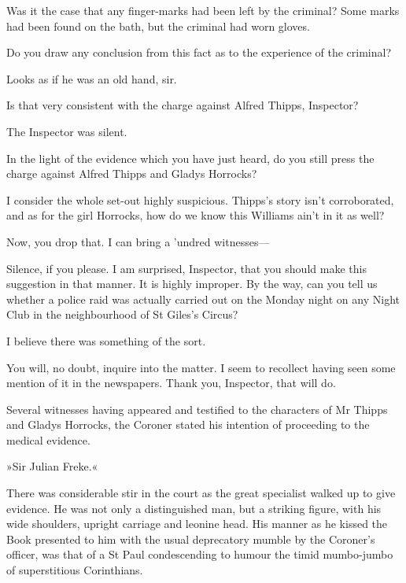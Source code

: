 \begin{dialogue}
 Was it the case that any finger-marks had been left by the criminal?
Some marks had been found on the bath, but the criminal had worn gloves.

 Do you draw any conclusion from this fact as to the experience of the criminal?

 Looks as if he was an old hand, sir.

 Is that very consistent with the charge against Alfred Thipps, Inspector?

The Inspector was silent.

 In the light of the evidence which you have just heard, do you still press the charge against Alfred Thipps and Gladys Horrocks?

 I consider the whole set-out highly suspicious. Thipps's story isn't corroborated, and as for the girl Horrocks, how do we know this Williams ain't in it as well?

 Now, you drop that. I can bring a 'undred witnesses---

 Silence, if you please. I am surprised, Inspector, that you should make this suggestion in that manner. It is highly improper. By the way, can you tell us whether a police raid was actually carried out on the Monday night on any Night Club in the neighbourhood of St Giles's Circus?

  I believe there was something of the sort.

 You will, no doubt, inquire into the matter. I seem to recollect having seen some mention of it in the newspapers. Thank you, Inspector, that will do.
\end{dialogue}

Several witnesses having appeared and testified to the characters of Mr Thipps and Gladys Horrocks, the Coroner stated his intention of proceeding to the medical evidence.

»Sir Julian Freke.«

There was considerable stir in the court as the great specialist walked up to give evidence. He was not only a distinguished man, but a striking figure, with his wide shoulders, upright carriage and leonine head. His manner as he kissed the Book presented to him with the usual deprecatory mumble by the Coroner's officer, was that of a St Paul condescending to humour the timid mumbo-jumbo of superstitious Corinthians.

